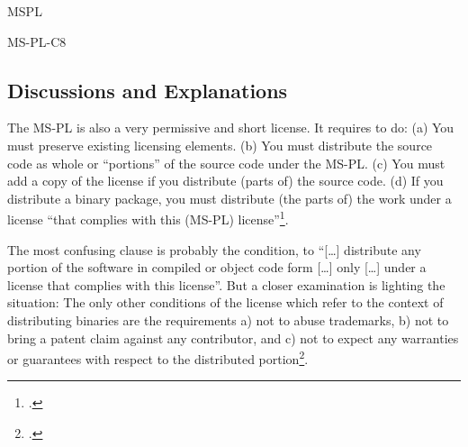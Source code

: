 \begin{license}{MSPL}
\begin{lsuc}{MS-PL-C8}

  \begin{lsucrequires}
  
  
  \end{lsucrequires}

  \begin{lsucprohibits}
    \lsucitem{\noLogoOrTrademark} 
  \end{lsucprohibits}
\end{lsuc}

\subsection{Discussions and Explanations}
\label{MSPLDiscussion}

The MS-PL is also a very permissive and short license. It requires to do:
(a) You must preserve existing licensing elements. (b) You must distribute
the source code as whole or \enquote{portions} of the source code under the
MS-PL. (c) You must add a copy of the license if you distribute (parts of) the
source code. (d) If you distribute a binary package, you must distribute (the
parts of) the work under a license \enquote{that complies with this (MS-PL)
license}\footcite[cf.][\nopage wp]{MsplOsiLicense2013a}.

The most confusing clause is probably the condition, to \enquote{[\ldots]
distribute any portion of the software in compiled or object code form [\ldots]
only [\ldots] under a license that complies with this license}. But a closer
examination is lighting the situation: The only other conditions of the license
which refer to the context of distributing binaries are the requirements a) not
to abuse trademarks, b) not to bring a patent claim against any contributor, and
c) not to expect any warranties or guarantees with respect to the distributed
portion\footcite[cf.][\nopage wp.\ §3A, §3B, §3E]{MsplOsiLicense2013a}.


\end{license}
